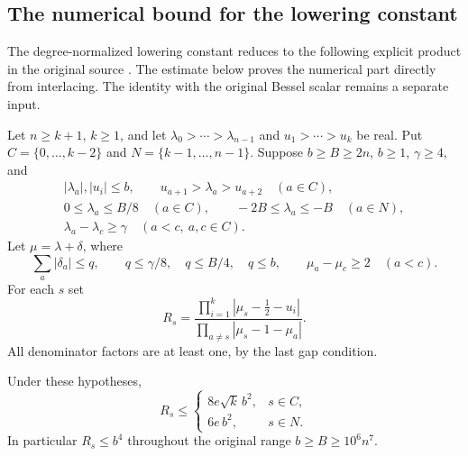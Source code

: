 \subsection{The numerical bound for the lowering constant}
\label{archimedean-lowering-product}

The degree-normalized lowering constant reduces to the following
explicit product in the original source \cite{lowering-product-source}.
The estimate below proves the numerical part directly from interlacing.
The identity with the original Bessel scalar remains a separate input.

Let $n\ge k+1$, $k\ge1$, and let
$\lambda_0>\cdots>\lambda_{n-1}$ and $u_1>\cdots>u_k$ be real.
Put $C=\{0,\ldots,k-2\}$ and $N=\{k-1,\ldots,n-1\}$.
Suppose $b\ge B\ge2n$, $b\ge1$, $\gamma\ge4$, and
\[
 \begin{gathered}
 |\lambda_a|,|u_i|\le b,\qquad
 u_{a+1}>\lambda_a>u_{a+2}\quad(a\in C),\\
 0\le\lambda_a\le B/8\quad(a\in C),\qquad
 -2B\le\lambda_a\le-B\quad(a\in N),\\
 \lambda_a-\lambda_c\ge\gamma\quad(a<c,\ a,c\in C).
 \end{gathered}
\]
Let $\mu=\lambda+\delta$, where
\[
 \sum_a|\delta_a|\le q,\qquad
 q\le\gamma/8,\quad q\le B/4,\quad q\le b,
 \qquad \mu_a-\mu_c\ge2\quad(a<c).
\]
For each $s$ set
\[
 R_s=\frac{\prod_{i=1}^k|\mu_s-\tfrac12-u_i|}
                 {\prod_{a\ne s}|\mu_s-1-\mu_a|}.
\]
All denominator factors are at least one, by the last gap condition.

\begin{theorem}\label{original-lowering-product-bound}
Under these hypotheses,
\[
 R_s\le
 \begin{cases}
     8e\sqrt{k}\,b^2,&s\in C,\\
     6e\,b^2,&s\in N.
 \end{cases}
\]
In particular $R_s\le b^4$ throughout the original range
$b\ge B\ge10^6n^7$.
\end{theorem}

